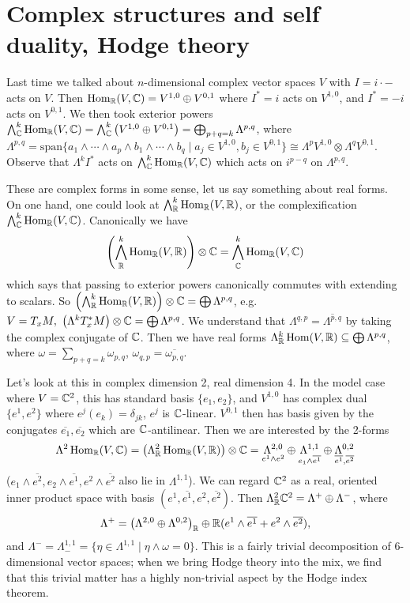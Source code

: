 \section{Complex structures and self duality, Hodge theory} 
Last time we talked about $n$-dimensional complex vector spaces $V$ with $I = i \cdot  -$ acts on $V$. Then $\operatorname{Hom} _{\mathbb{R}}(V, \mathbb{C}) = V ^{1,0}\oplus V ^{0,1}$ where $I^*=i$ acts on $V ^{1,0}$, and $I^* = -i $ acts on $V^{0,1}$. We then took exterior powers $\bigwedge ^k _{\mathbb{C}}\operatorname{Hom}_{\mathbb{R}}(V,\mathbb{C}) = \bigwedge _{\mathbb{C}}^k \left( V ^{1,0}\oplus V^{0,1} \right)= \bigoplus _{p+q=k}\Lambda ^{p,q} $, where $\Lambda^{p,q}= \mathrm{span}\{a_1 \wedge \cdots \wedge a_p \wedge b_1 \wedge \cdots \wedge b_q \mid a_j  \in V^{1,0}, b_j  \in V^{0,1}\} \cong \Lambda^p V^{1,0}\otimes \Lambda^q V^{0,1}$. Observe that $\Lambda^kI^*$ acts on $\bigwedge ^k _{\mathbb{C}}\operatorname{Hom} _{\mathbb{R}} (V,\mathbb{C})$ which acts on $i ^{p-q}$ on $\Lambda^{p,q}$.

These are complex forms in some sense, let us say something about real forms. On one hand, one could look at $\bigwedge^k _{\mathbb{R}}\operatorname{Hom} _{\mathbb{R}}(V,\mathbb{R})$, or the complexification $\bigwedge _{\mathbb{C}}^k \operatorname{Hom} _{\mathbb{R}}(V,\mathbb{C})$. Canonically we have
\[
    \left( \bigwedge _{\mathbb{R}}^k \operatorname{Hom} _{\mathbb{R}}(V,\mathbb{R}) \right) \otimes \mathbb{C} = \bigwedge _{\mathbb{C}}^k\operatorname{Hom} _{\mathbb{R}}(V,\mathbb{C})
\] 
which says that passing to exterior powers canonically commutes with extending to scalars. So $\left( \bigwedge _{\mathbb{R}}^k \operatorname{Hom} _{\mathbb{R}}(V,\mathbb{R}) \right) \otimes \mathbb{C} = \bigoplus \Lambda^{p,q}$, e.g. $V = T_x M,\ \left( \Lambda^k T^*_x M \right) \otimes \mathbb{C} = \bigoplus \Lambda^{p,q}$. We understand that $\Lambda^{q,p}= \overline{\Lambda^{p,q}}$ by taking the complex conjugate of $\mathbb{C}$. Then we have real forms $\Lambda^k _{\mathbb{R}}\operatorname{Hom}(V,\mathbb{R}) \subseteq \bigoplus \Lambda^{p,q}$, where $\omega= \sum_{p+q=k} \omega _{p,q}$, $\omega _{q,p}= \overline{\omega _{p,q}}$. 

Let's look at this in complex dimension 2, real dimension 4. In the model case where $V = \mathbb{C}^2$, this has standard basis $\{e_1,e_2\} $, and $V ^{1,0}$ has complex dual $\{e^1,e^2\} $ where $e^j (e_k)= \delta _{jk}$, $e^j $ is $\mathbb{C}$-linear. $V^{0,1}$ then has basis given by the conjugates $\overline{e_1}, \overline{e_2}$ which are $\mathbb{C}$-antilinear. Then we are interested by the 2-forms 
\[
\Lambda^2 \operatorname{Hom} _{\mathbb{R}}(V, \mathbb{C}) = \left( \Lambda^2_{\mathbb{R}}\operatorname{Hom} _{\mathbb{R}}(V,\mathbb{R}) \right)\otimes \mathbb{C} = \underset{e^1 \wedge e^2}{\Lambda^{2,0}} \oplus \underset{e_1 \wedge \overline{e^1}}{\Lambda^{1,1}} \oplus \underset{\overline{e^1}, \overline{e^2}}{\Lambda^{0,2}} 
\]($e_1 \wedge \overline{e^2}, e_2 \wedge \overline{e^1}, e^2\wedge\overline{e^2}$ also lie in $\Lambda^{1,1}$). We can regard $\mathbb{C}^2$ as a real, oriented inner product space with basis $\left( e^1, \overline{e^1}, e^2, \overline{e^2} \right) $. Then $\Lambda^2 _{\mathbb{R}}\mathbb{C}^2= \Lambda^+ \oplus \Lambda^-$, where \[
\Lambda^+ = \left( \Lambda^{2,0} \oplus \Lambda^{0,2}\right) _{\mathbb{R}} \oplus \mathbb{R}(e^1 \wedge \overline{e^1} + e^2 \wedge \overline{e^2}),
\] and
$\Lambda^- = \Lambda^{1,1}_- = \{\eta \in \Lambda^{1,1}\mid  \eta \wedge \omega = 0\} $.
This is a fairly trivial decomposition of 6-dimensional vector spaces; when we bring Hodge theory into the mix, we find that this trivial matter has a highly non-trivial aspect by the Hodge index theorem.

